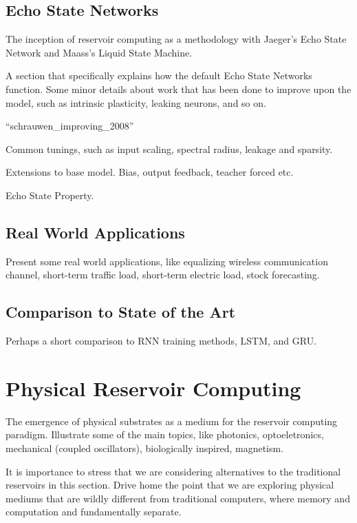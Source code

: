 \subsection{Echo State Networks}

The inception of reservoir computing as a methodology with Jaeger's Echo State
Network and Maass's Liquid State Machine.

A section that specifically explains how the default Echo State Networks
function. Some minor details about work that has been done to improve upon the
model, such as intrinsic plasticity, leaking neurons, and so on.

``schrauwen_improving_2008''

Common tunings, such as input scaling, spectral radius, leakage and sparsity.

Extensions to base model. Bias, output feedback, teacher forced etc.

Echo State Property.

\subsection{Real World Applications}

Present some real world applications, like equalizing wireless communication
channel, short-term traffic load, short-term electric load, stock forecasting.

\subsection{Comparison to State of the Art}

Perhaps a short comparison to RNN training methods, LSTM, and GRU.

\section{Physical Reservoir Computing}

The emergence of physical substrates as a medium for the reservoir computing
paradigm. Illustrate some of the main topics, like photonics, optoeletronics,
mechanical (coupled oscillators), biologically inspired, magnetism.

It is importance to stress that we are considering alternatives to the
traditional reservoirs in this section. Drive home the point that we are
exploring physical mediums that are wildly different from traditional computers,
where memory and computation and fundamentally separate.

